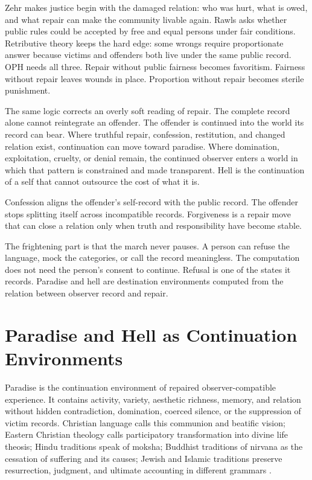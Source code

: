 \documentclass[11pt]{article}
\theoremstyle{remark}
\theoremstyle{plain}
\begin{document}
Zehr makes justice begin with the damaged relation: who was hurt, what is owed,
and what repair can make the community livable again. Rawls asks whether public
rules could be accepted by free and equal persons under fair conditions.
Retributive theory keeps the hard edge: some wrongs require proportionate
answer because victims and offenders both live under the same public record.
OPH needs all three. Repair without public fairness becomes favoritism.
Fairness without repair leaves wounds in place. Proportion without repair
becomes sterile punishment.

The same logic corrects an overly soft reading of repair. The complete record alone
cannot reintegrate an offender. The offender is continued into the world its
record can bear. Where truthful repair, confession,
restitution, and changed relation exist, continuation can move toward
paradise. Where domination, exploitation, cruelty, or denial remain, the
continued observer enters a world in which that pattern is constrained and
made transparent. Hell is the continuation of a self that cannot outsource the
cost of what it is.

Confession aligns the offender's self-record with the public record. The
offender stops splitting itself across incompatible records. Forgiveness is a
repair move that can close a relation only when truth and responsibility have
become stable.

The frightening part is that the march never pauses. A person can refuse the
language, mock the categories, or call the record meaningless. The computation
does not need the person's consent to continue. Refusal is one of the states it
records. Paradise and hell are destination environments computed from the
relation between observer record and repair.

\section{Paradise and Hell as Continuation Environments}

Paradise is the continuation environment of repaired
observer-compatible experience. It contains activity, variety, aesthetic
richness, memory, and relation without hidden contradiction, domination,
coerced silence, or the suppression of victim records. Christian language
calls this communion and beatific vision; Eastern
Christian theology calls participatory transformation into divine life theosis;
Hindu traditions speak of moksha; Buddhist traditions of nirvana as the
cessation of suffering and its causes; Jewish and Islamic traditions preserve
resurrection, judgment, and ultimate accounting in different grammars
\cite{CCCHeaven,Lossky1957,BhagavadGita,Rahula1959,Maimonides,Quran,Bible}.
\end{document}
